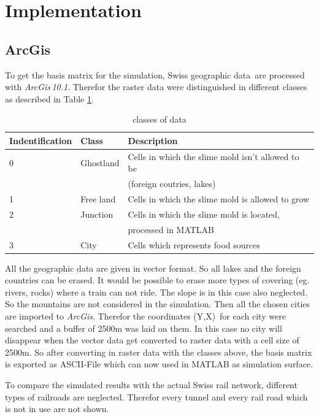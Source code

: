 \documentclass[11pt]{scrartcl}
\begin{document}
\section{Implementation}
\subsection{ArcGis}
\label{sec:arcgis}

To get the basis matrix for the simulation, Swiss geographic data\,\cite{gis_data} are processed with \textit{ArcGis\,10.1}. Therefor the raster data were distinguished in different classes as described in Table \ref{tab:class}.

\begin{table}[H]
	\centering
	\caption{classes of data}
		\begin{tabular}{lll}
		\toprule
		Indentification & Class & Description \\
		\midrule
		0 & Ghostland & Cells in which the slime mold isn't allowed to be\\
		& 		& (foreign coutries, lakes)\\
		1 & Free land & Cells in which the slime mold is allowed to grow\\
		2 & Junction & Cells in which the slime mold is located, \\
		& & processed in MATLAB\\
		3 & City & Cells which represents food sources\\
		\bottomrule
	\end{tabular}
\label{tab:class}
\end{table}

All the geographic data are given in vector format. So all lakes and the foreign countries can be erased. It would be possible to erase more types of covering (eg. rivers, rocks) where a train can not ride. The slope is in this case also neglected. So the mountains are not considered in the simulation. Then all the chosen cities are imported to \textit{ArcGis}. Therefor the coordinates (Y,X)\,\cite{coordinates} for each city were searched and a buffer of 2500m was laid on them. In this case no city will disappear when the vector data get converted to raster data with a cell size of 2500m. So after converting in raster data with the classes above, the basis matrix is exported as ASCII-File which can now used in MATLAB as simulation surface.

To compare the simulated results with the actual Swiss rail network, different types of railroads are neglected. Therefor every tunnel and every rail road which is not in use are not shown.
\end{document}
